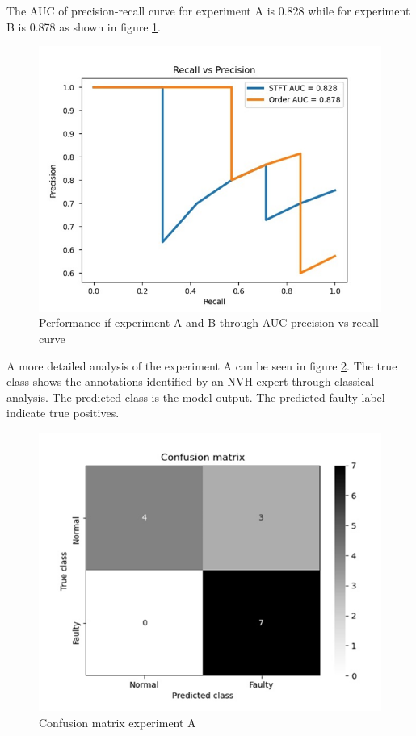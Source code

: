 \documentclass[conference]{IEEEtran}
\begin{document}
The AUC of precision-recall curve for experiment A is 0.828 while for experiment B is 0.878 as shown in figure \ref{fig:auc_expa_expb}.  

\begin{figure}[htbp]
\centerline{\includegraphics[scale=0.45]{auc.png}}
\caption{Performance if experiment A and B through AUC precision vs recall curve}
\label{fig:auc_expa_expb}
\end{figure}

A more detailed analysis of the experiment A can be seen in figure \ref{fig:conf_matrix_expa}. The true class shows the annotations identified by an NVH expert through classical analysis. The predicted class is the model output. The predicted faulty label indicate true positives.     

\begin{figure}[htbp]
\centerline{\includegraphics[scale=0.5]{conf_matrix_stft.png}}
\caption{Confusion matrix experiment A}
\label{fig:conf_matrix_expa}
\end{figure}
\end{document}
